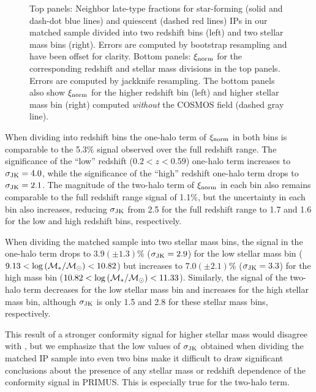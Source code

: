 \begin{figure*}
  \epstrim{0.2in 0.3in 0.4in 0.8in}
  \caption{
Top panels: Neighbor late-type fractions for star-forming (solid and dash-dot blue lines) and quiescent (dashed red lines) IPs in our matched sample divided into two redshift bins (left) and two stellar mass bins (right).  Errors are computed by bootstrap resampling and have been offset for clarity.
Bottom panels: $\signorm$ for the corresponding redshift and stellar mass divisions in the top panels.  Errors are computed by jackknife resampling.
The bottom panels also show $\signorm$ for the higher redshift bin (left) and higher stellar mass bin (right) computed \emph{without} the COSMOS field (dashed gray line).
}
  \label{fig:latefrac_normsig_compare}
\end{figure*}

When dividing into redshift bins the one-halo term of $\signorm$ in both bins is comparable to the 5.3\% signal observed over the full redshift range.
The significance of the ``low'' redshift (${0.2<z<0.59}$) one-halo term increases to 
${\sigmaJK=4.0}$, while the significance of the ``high'' redshift one-halo term drops to ${\sigmaJK=2.1}$.
The magnitude of the two-halo term of $\signorm$ in each bin also remains comparable to the full redshift range signal of 1.1\%, but the uncertainty in each bin also increases,
reducing $\sigmaJK$ from 2.5 for the full redshift range to 1.7 and 1.6 for the low and high redshift bins, respectively.

When dividing the matched sample into two stellar mass bins, the signal in the 
one-halo term drops to ${3.9(\pm1.3)}$\% (${\sigmaJK=2.9}$) for the low stellar mass bin (${9.13<\log\,(\mstar/\msun)<10.82}$) but
increases to ${7.0(\pm2.1)}$\% (${\sigmaJK=3.3}$) for the high mass bin (${10.82<\log\,(\mstar/\msun)<11.33}$).
Similarly, the signal of the two-halo term decreases for the low stellar mass bin 
and increases for the high stellar mass bin, although $\sigmaJK$ is only 1.5 
and 2.8 for these stellar mass bins, respectively.

This result of a stronger conformity signal for higher stellar mass would disagree with \citet{Hearin15b},
but we emphasize that the low values of $\sigmaJK$ obtained when dividing the matched IP sample into even two bins 
make it difficult to draw significant conclusions about the presence of any 
stellar mass or redshift dependence of the conformity signal in PRIMUS.
This is especially true for the two-halo term.

